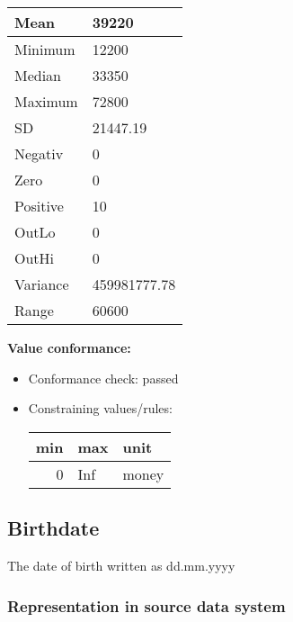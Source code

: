 \documentclass[
]{article}
\providecommand{\tightlist}{%
  \setlength{\itemsep}{0pt}\setlength{\parskip}{0pt}}
\begin{document}
\begin{table}[H]
\centering
\begin{tabular}{l|l}
\hline
Mean & 39220\\
\hline
Minimum & 12200\\
\hline
Median & 33350\\
\hline
Maximum & 72800\\
\hline
SD & 21447.19\\
\hline
Negativ & 0\\
\hline
Zero & 0\\
\hline
Positive & 10\\
\hline
OutLo & 0\\
\hline
OutHi & 0\\
\hline
Variance & 459981777.78\\
\hline
Range & 60600\\
\hline
\end{tabular}
\end{table}

\textbf{Value conformance:}

\begin{itemize}
\tightlist
\item
  Conformance check: passed
\item
  Constraining values/rules:

  \begin{table}[H]
  \centering
  \begin{tabular}{r|l|l}
  \hline
  \textbf{min} & \textbf{max} & \textbf{unit}\\
  \hline
  0 & Inf & money\\
  \hline
  \end{tabular}
  \end{table}
\end{itemize}

\newpage

\hypertarget{birthdate}{%
\subsection{Birthdate}\label{birthdate}}

The date of birth written as dd.mm.yyyy

\hypertarget{representation-in-source-data-system-2}{%
\subsubsection{\texorpdfstring{Representation in \textbf{source} data
system}{Representation in source data system}}\label{representation-in-source-data-system-2}}
\end{document}
